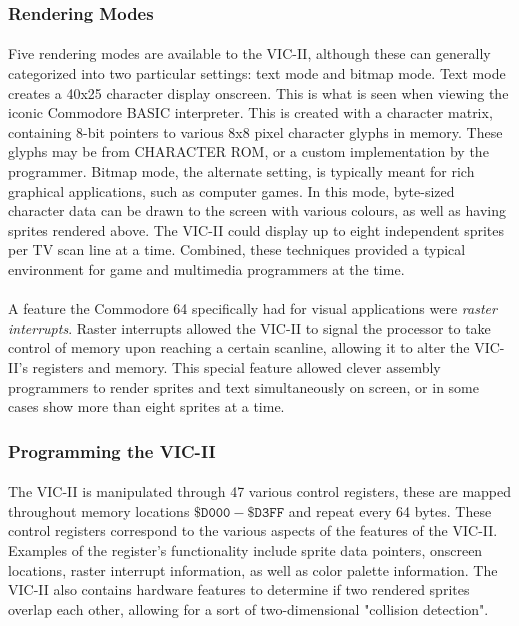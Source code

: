 \documentclass{article}
\begin{document}
\subsubsection{Rendering Modes}
\paragraph{}
Five rendering modes are available to the VIC-II, although these can generally categorized into two particular settings: text mode and bitmap mode. Text mode creates a 40x25 character display onscreen. This is what is seen when viewing the iconic Commodore BASIC interpreter. This is created with a character matrix, containing 8-bit pointers to various 8x8 pixel character glyphs in memory. These glyphs may be from CHARACTER ROM, or a custom implementation by the programmer. Bitmap mode, the alternate setting, is typically meant for rich graphical applications, such as computer games. In this mode, byte-sized character data can be drawn to the screen with various colours, as well as having sprites rendered above. The VIC-II could display up to eight independent sprites per TV scan line at a time. Combined, these techniques provided a typical environment for game and multimedia programmers at the time.

\paragraph{}
A feature the Commodore 64 specifically had for visual applications were \textit{raster interrupts}. Raster interrupts allowed the VIC-II to signal the processor to take control of memory upon reaching a certain scanline, allowing it to alter the VIC-II's registers and memory. This special feature allowed clever assembly programmers to render sprites and text simultaneously on screen, or in some cases show more than eight sprites at a time.

\subsubsection{Programming the VIC-II}
\paragraph{}
The VIC-II is manipulated through 47 various control registers, these are mapped throughout memory locations $\mathtt{\$D000 - \$D3FF}$ and repeat every 64 bytes. These control registers correspond to the various aspects of the features of the VIC-II. Examples of the register's functionality include sprite data pointers, onscreen locations, raster interrupt information, as well as color palette information. The VIC-II also contains hardware features to determine if two rendered sprites overlap each other, allowing for a sort of two-dimensional "collision detection".
\end{document}
